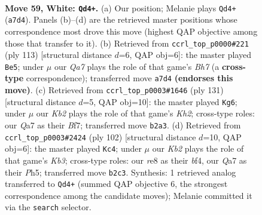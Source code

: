 \documentclass[11pt]{article}
\begin{document}
\clearpage

\begin{figure}[p]\centering
\begin{subfigure}{0.46\textwidth}\centering
\resizebox{\linewidth}{!}{%
\newchessgame
\chessboard[
  setfen={4r3/Q7/3k4/6P1/4P2P/8/1K6/8 w - - 3 59},
  showmover=false,
  pgfstyle=straightmove, color=movearrow, markmove={a7-d4}
]}
\caption{}
\end{subfigure}\hfill
\begin{subfigure}{0.46\textwidth}\centering
\resizebox{\linewidth}{!}{%
\newchessgame
\chessboard[
  setfen={8/5k2/2R5/2p2p2/2P1p3/8/5K1b/8 b - - 10 57},
  showmover=false,
  pgfstyle=straightmove, color=movearrow, markmove={h2-e5}
]}
\caption{}
\end{subfigure}
\\[4pt]
\begin{subfigure}{0.46\textwidth}\centering
\resizebox{\linewidth}{!}{%
\newchessgame
\chessboard[
  setfen={8/5b1k/8/R7/1p6/p7/7P/K7 b - - 7 66},
  showmover=false,
  pgfstyle=straightmove, color=movearrow, markmove={h7-g6}
]}
\caption{}
\end{subfigure}\hfill
\begin{subfigure}{0.46\textwidth}\centering
\resizebox{\linewidth}{!}{%
\newchessgame
\chessboard[
  setfen={8/4k3/8/4P2P/5b2/1K3P2/6P1/8 w - - 3 52},
  showmover=false,
  pgfstyle=straightmove, color=movearrow, markmove={b3-c4}
]}
\caption{}
\end{subfigure}
\caption{\textbf{Move 59, White: \texttt{Qd4+}.} (a) Our position; Melanie plays \texttt{Qd4+} (\texttt{a7d4}). Panels (b)--(d) are the retrieved master positions whose correspondence most drove this move (highest QAP objective among those that transfer to it). (b) Retrieved from \texttt{ccrl\_top\_p0000\#221} (ply 113) [structural distance $d$=6, QAP obj=6]: the master played \texttt{Be5}; under $\mu$ our \emph{Qa7} plays the role of that game's \emph{Bh7} (a \textbf{cross-type} correspondence); transferred move \texttt{a7d4} \textbf{(endorses this move)}. (c) Retrieved from \texttt{ccrl\_top\_p0003\#1646} (ply 131) [structural distance $d$=5, QAP obj=10]: the master played \texttt{Kg6}; under $\mu$ our \emph{Kb2} plays the role of that game's \emph{Kh2}; cross-type roles: our \emph{Q}a7 as their \emph{B}f7; transferred move \texttt{b2a3}. (d) Retrieved from \texttt{ccrl\_top\_p0003\#2424} (ply 102) [structural distance $d$=10, QAP obj=6]: the master played \texttt{Kc4}; under $\mu$ our \emph{Kb2} plays the role of that game's \emph{Kb3}; cross-type roles: our \emph{r}e8 as their \emph{b}f4, our \emph{Q}a7 as their \emph{P}h5; transferred move \texttt{b2c3}. Synthesis: 1 retrieved analog transferred to \texttt{Qd4+} (summed QAP objective 6, the strongest correspondence among the candidate moves); Melanie committed it via the \texttt{search} selector.}
\label{fig:thought-m116}
\end{figure}
\end{document}
